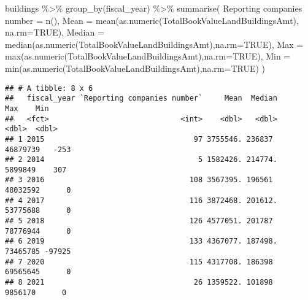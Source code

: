 \documentclass[
]{article}
\newenvironment{Shaded}{\begin{snugshade}}{\end{snugshade}}
\newcommand{\AttributeTok}[1]{\textcolor[rgb]{0.77,0.63,0.00}{#1}}
\newcommand{\ConstantTok}[1]{\textcolor[rgb]{0.00,0.00,0.00}{#1}}
\newcommand{\FunctionTok}[1]{\textcolor[rgb]{0.00,0.00,0.00}{#1}}
\newcommand{\NormalTok}[1]{#1}
\newcommand{\OtherTok}[1]{\textcolor[rgb]{0.56,0.35,0.01}{#1}}
\newcommand{\SpecialCharTok}[1]{\textcolor[rgb]{0.00,0.00,0.00}{#1}}
\newcommand{\StringTok}[1]{\textcolor[rgb]{0.31,0.60,0.02}{#1}}
\begin{document}
\begin{Shaded}
\begin{Highlighting}[]
\NormalTok{buildings }\SpecialCharTok{\%\textgreater{}\%} 
  \FunctionTok{group\_by}\NormalTok{(fiscal\_year) }\SpecialCharTok{\%\textgreater{}\%} 
  \FunctionTok{summarise}\NormalTok{(}
    \StringTok{\textasciigrave{}}\AttributeTok{Reporting companies number}\StringTok{\textasciigrave{}} \OtherTok{=} \FunctionTok{n}\NormalTok{(),}
    \AttributeTok{Mean =} \FunctionTok{mean}\NormalTok{(}\FunctionTok{as.numeric}\NormalTok{(TotalBookValueLandBuildingsAmt), }\AttributeTok{na.rm=}\ConstantTok{TRUE}\NormalTok{),}
    \AttributeTok{Median =} \FunctionTok{median}\NormalTok{(}\FunctionTok{as.numeric}\NormalTok{(TotalBookValueLandBuildingsAmt),}\AttributeTok{na.rm=}\ConstantTok{TRUE}\NormalTok{),}
    \AttributeTok{Max =} \FunctionTok{max}\NormalTok{(}\FunctionTok{as.numeric}\NormalTok{(TotalBookValueLandBuildingsAmt),}\AttributeTok{na.rm=}\ConstantTok{TRUE}\NormalTok{),}
    \AttributeTok{Min =} \FunctionTok{min}\NormalTok{(}\FunctionTok{as.numeric}\NormalTok{(TotalBookValueLandBuildingsAmt),}\AttributeTok{na.rm=}\ConstantTok{TRUE}\NormalTok{)}
\NormalTok{  ) }
\end{Highlighting}
\end{Shaded}

\begin{verbatim}
## # A tibble: 8 x 6
##   fiscal_year `Reporting companies number`     Mean  Median      Max    Min
##   <fct>                              <int>    <dbl>   <dbl>    <dbl>  <dbl>
## 1 2015                                  97 3755546. 236837  46879739   -253
## 2 2014                                   5 1582426. 214774.  5899849    307
## 3 2016                                 108 3567395. 196561  48032592      0
## 4 2017                                 116 3872468. 201612. 53775688      0
## 5 2018                                 126 4577051. 201787  78776944      0
## 6 2019                                 133 4367077. 187498. 73465785 -97925
## 7 2020                                 115 4317708. 186398  69565645      0
## 8 2021                                  26 1359522. 101898   9856170      0
\end{verbatim}
\end{document}
